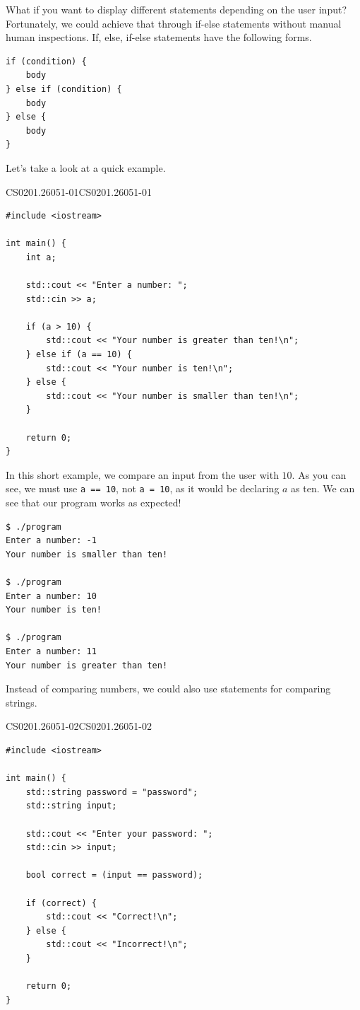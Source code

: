 \documentclass[../../main.tex]{subfiles}
\begin{document}
What if you want to display different statements depending on
the user input? Fortunately, we could achieve that through
if-else statements without manual human inspections. If, else,
if-else statements have the following forms.

\begin{basicbox}
\begin{lstlisting}[style=basic]
if (condition) {
    body
} else if (condition) {
    body
} else {
    body
}
\end{lstlisting}
\end{basicbox}

Let's take a look at a quick example.

\begin{cppbox}{CS0201.26051-01}{CS0201.26051-01}
\begin{lstlisting}[style=cppstyle]
#include <iostream>

int main() {
    int a;

    std::cout << "Enter a number: ";
    std::cin >> a;

    if (a > 10) {
        std::cout << "Your number is greater than ten!\n";
    } else if (a == 10) {
        std::cout << "Your number is ten!\n";
    } else {
        std::cout << "Your number is smaller than ten!\n";
    }

    return 0;
}
\end{lstlisting}
\end{cppbox}

In this short example, we compare an input from the user with $10$.
As you can see, we must use \verb|a == 10|, not \verb|a = 10|, as
it would be declaring $a$ as ten. We can see that our program works
as expected!

\begin{outputbox}
\begin{lstlisting}[style=basic]
$ ./program
Enter a number: -1
Your number is smaller than ten!

$ ./program
Enter a number: 10
Your number is ten!

$ ./program
Enter a number: 11
Your number is greater than ten!
\end{lstlisting}
\end{outputbox}

Instead of comparing numbers, we could also use statements for
comparing strings.

\begin{cppbox}{CS0201.26051-02}{CS0201.26051-02}
\begin{lstlisting}[style=cppstyle]
#include <iostream>

int main() {
    std::string password = "password";
    std::string input;

    std::cout << "Enter your password: ";
    std::cin >> input;

    bool correct = (input == password);

    if (correct) {
        std::cout << "Correct!\n";
    } else {
        std::cout << "Incorrect!\n";
    }

    return 0;
}
\end{lstlisting}
\end{cppbox}
\end{document}
